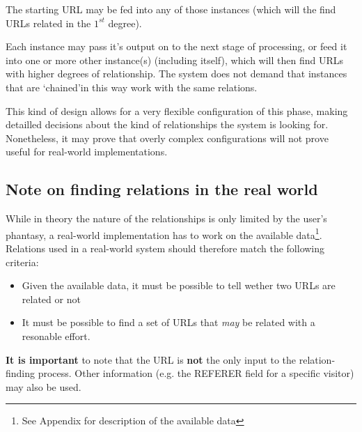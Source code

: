 \documentclass[a4paper]{danarticle}
\begin{document}
       The starting URL may be fed into any of those instances
       (which will the find URLs related in the $ 1^{st} $
       degree). 
       
       Each instance may pass it's output on to the next stage
       of processing, or feed it into one or more other instance(s) 
       (including itself), which will then find URLs with higher
       degrees of relationship. The system does not demand that
       instances that are \lq chained\rq in this way work with
       the same relations. 
       
       This kind of design allows for a very flexible configuration
       of this phase, making detailled decisions about the kind
       of relationships the system is looking for.
       Nonetheless, it may prove that overly complex configurations
       will not prove useful for real-world implementations.
     \subsection*{Note on finding relations in the real world}
       While in theory the nature of the relationships is only
       limited by the user's phantasy, a real-world implementation
       has to work on the available data\footnote{See Appendix for
       description of the available data}. Relations used in a
       real-world system should therefore match the following
       criteria:
       \begin{itemize}
         \item{Given the available data, it must be possible to
	       tell wether two URLs are related or not}
	 \item{It must be possible to find a set of 
	       URLs that \textit{may} be related with
	       a resonable effort.}
       \end{itemize}
       \textbf{It is important} to note that the URL is \textbf{not}
       the only input to the relation-finding process. Other information
       (e.g. the REFERER field for a specific visitor) may also be used.
\end{document}
